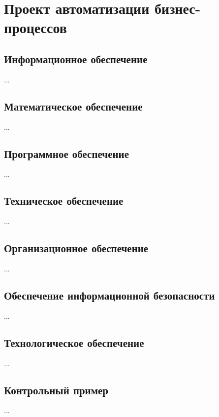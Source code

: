 \documentclass[../thesis.tex]{subfiles}
\begin{document}
\section{Проект автоматизации бизнес-процессов}
\subsection{Информационное обеспечение}

...



\subsection{Математическое обеспечение}

...



\subsection{Программное обеспечение}

...



\subsection{Техническое обеспечение}

...



\subsection{Организационное обеспечение}

...



\subsection{Обеспечение информационной безопасности}

...



\subsection{Технологическое обеспечение}

...



\subsection{Контрольный пример}

...
\end{document}
